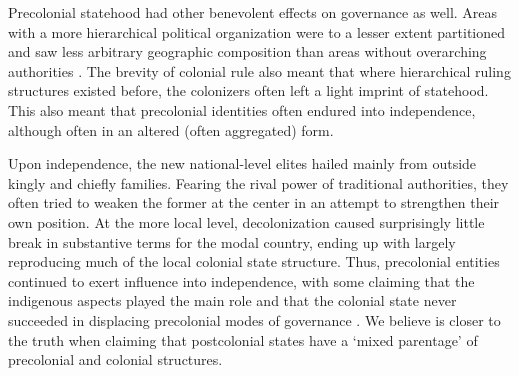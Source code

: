 Precolonial statehood had other benevolent effects on governance as well. Areas
with a more hierarchical political organization were to a lesser extent
partitioned and saw less arbitrary geographic composition than areas without
overarching authorities \citep{Green2012,Nugent1996}. The brevity of colonial
rule also meant that where hierarchical ruling structures existed before, the
colonizers often left a light imprint of statehood. This also meant that
precolonial identities often endured into independence, although often in an
altered (often aggregated) form. 



Upon independence, the new national-level elites hailed mainly from outside
kingly and chiefly families. Fearing the rival power of traditional authorities,
they often tried to weaken the former at the center in an attempt to strengthen
their own position. At the more local level, decolonization caused surprisingly
little break in substantive terms for the modal country, ending up with largely
reproducing much of the local colonial state structure. Thus, precolonial
entities continued to exert influence into independence, with some claiming that
the indigenous aspects played the main role and that the colonial state never
succeeded in displacing precolonial modes of governance
\citep{ChabalPatrick1999Aw:d}. We believe \citet[22]{englebert2013inside} is
closer to the truth when claiming that postcolonial states have a `mixed
parentage' of precolonial and colonial structures.

